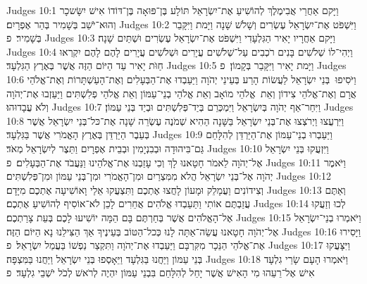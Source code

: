 Judges 10:1	וַיָּקם אַחֲרֵי אֲבִימֶלֶךְ לְהוֹשִׁיעַ אֶת־יִשְׂרָאֵל תּוֹלָע בֶּן־פּוּאָה בֶּן־דּוֹדוֹ אִישׁ יִשָּׂשכָר וְהוּא־יֹשֵׁב בְּשָׁמִיר בְּהַר אֶפְרָיִם׃
Judges 10:2	וַיִּשְׁפֹּט אֶת־יִשְׂרָאֵל עֶשְׂרִים וְשָׁלֹשׁ שָׁנָה וַיָּמת וַיִּקָּבֵר בְּשָׁמִיר׃ {פ}
Judges 10:3	וַיָּקם אַחֲרָיו יָאִיר הַגִּלְעָדִי וַיִּשְׁפֹּט אֶת־יִשְׂרָאֵל עֶשְׂרִים וּשְׁתַּיִם שָׁנָה׃
Judges 10:4	וַיְהִי־לוֹ שְׁלֹשִׁים בָּנִים רֹכְבִים עַל־שְׁלֹשִׁים עֲיָרִים וּשְׁלֹשִׁים עֲיָרִים לָהֶם לָהֶם יִקְרְאוּ  חַוֺּת יָאִיר עַד הַיּוֹם הַזֶּה אֲשֶׁר בְּאֶרֶץ הַגִּלְעָד׃
Judges 10:5	וַיָּמת יָאִיר וַיִּקָּבֵר בְּקָמוֹן׃ {פ}
Judges 10:6	וַיֹּסִיפוּ  בְּנֵי יִשְׂרָאֵל לַעֲשׂוֹת הָרַע בְּעֵינֵי יְהֹוָה וַיַּעַבְדוּ אֶת־הַבְּעָלִים וְאֶת־הָעַשְׁתָּרוֹת וְאֶת־אֱלֹהֵי אֲרָם וְאֶת־אֱלֹהֵי צִידוֹן וְאֵת  אֱלֹהֵי מוֹאָב וְאֵת אֱלֹהֵי בְנֵי־עַמּוֹן וְאֵת אֱלֹהֵי פְלִשְׁתִּים וַיַּעַזְבוּ אֶת־יְהֹוָה וְלֹא עֲבָדוּהוּ׃
Judges 10:7	וַיִּחַר־אַף יְהֹוָה בְּיִשְׂרָאֵל וַיִּמְכְּרֵם בְּיַד־פְּלִשְׁתִּים וּבְיַד בְּנֵי עַמּוֹן׃
Judges 10:8	וַיִּרְעֲצוּ וַיְרֹצְצוּ אֶת־בְּנֵי יִשְׂרָאֵל בַּשָּׁנָה הַהִיא שְׁמֹנֶה עֶשְׂרֵה שָׁנָה אֶת־כּל־בְּנֵי יִשְׂרָאֵל אֲשֶׁר בְּעֵבֶר הַיַּרְדֵּן בְּאֶרֶץ הָאֱמֹרִי אֲשֶׁר בַּגִּלְעָד׃
Judges 10:9	וַיַּעַבְרוּ בְנֵי־עַמּוֹן אֶת־הַיַּרְדֵּן לְהִלָּחֵם גַּם־בִּיהוּדָה וּבְבִנְיָמִין וּבְבֵית אֶפְרָיִם וַתֵּצֶר לְיִשְׂרָאֵל מְאֹד׃
Judges 10:10	וַיִּזְעֲקוּ בְּנֵי יִשְׂרָאֵל אֶל־יְהֹוָה לֵאמֹר חָטָאנוּ לָךְ וְכִי עָזַבְנוּ אֶת־אֱלֹהֵינוּ וַנַּעֲבֹד אֶת־הַבְּעָלִים׃ {פ}
Judges 10:11	וַיֹּאמֶר יְהֹוָה אֶל־בְּנֵי יִשְׂרָאֵל הֲלֹא מִמִּצְרַיִם וּמִן־הָאֱמֹרִי וּמִן־בְּנֵי עַמּוֹן וּמִן־פְּלִשְׁתִּים׃
Judges 10:12	וְצִידוֹנִים וַעֲמָלֵק וּמָעוֹן לָחֲצוּ אֶתְכֶם וַתִּצְעֲקוּ אֵלַי וָאוֹשִׁיעָה אֶתְכֶם מִיָּדָם׃
Judges 10:13	וְאַתֶּם עֲזַבְתֶּם אוֹתִי וַתַּעַבְדוּ אֱלֹהִים אֲחֵרִים לָכֵן לֹא־אוֹסִיף לְהוֹשִׁיעַ אֶתְכֶם׃
Judges 10:14	לְכוּ וְזַעֲקוּ אֶל־הָאֱלֹהִים אֲשֶׁר בְּחַרְתֶּם בָּם הֵמָּה יוֹשִׁיעוּ לָכֶם בְּעֵת צָרַתְכֶם׃
Judges 10:15	וַיֹּאמְרוּ בְנֵי־יִשְׂרָאֵל אֶל־יְהֹוָה חָטָאנוּ עֲשֵׂה־אַתָּה לָנוּ כְּכל־הַטּוֹב בְּעֵינֶיךָ אַךְ הַצִּילֵנוּ נָא הַיּוֹם הַזֶּה׃
Judges 10:16	וַיָּסִירוּ אֶת־אֱלֹהֵי הַנֵּכָר מִקִּרְבָּם וַיַּעַבְדוּ אֶת־יְהֹוָה וַתִּקְצַר נַפְשׁוֹ בַּעֲמַל יִשְׂרָאֵל׃ {פ}
Judges 10:17	וַיִּצָּעֲקוּ בְּנֵי עַמּוֹן וַיַּחֲנוּ בַּגִּלְעָד וַיֵּאָסְפוּ בְּנֵי יִשְׂרָאֵל וַיַּחֲנוּ בַּמִּצְפָּה׃
Judges 10:18	וַיֹּאמְרוּ הָעָם שָׂרֵי גִלְעָד אִישׁ אֶל־רֵעֵהוּ מִי הָאִישׁ אֲשֶׁר יָחֵל לְהִלָּחֵם בִּבְנֵי עַמּוֹן יִהְיֶה לְרֹאשׁ לְכֹל יֹשְׁבֵי גִלְעָד׃ {פ}
